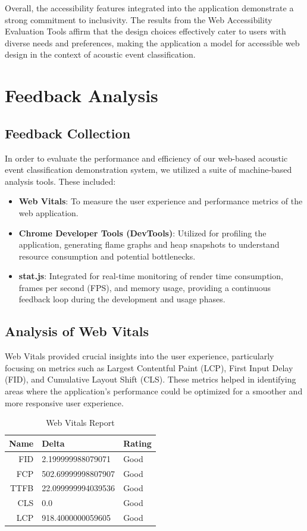 Overall, the accessibility features integrated into the application demonstrate a strong commitment to inclusivity. The results from the Web Accessibility Evaluation Tools affirm that the design choices effectively cater to users with diverse needs and preferences, making the application a model for accessible web design in the context of acoustic event classification.

\section{Feedback Analysis}
\subsection{Feedback Collection}
In order to evaluate the performance and efficiency of our web-based acoustic event classification demonstration system, we utilized a suite of machine-based analysis tools. These included:

\begin{itemize}
  \item \textbf{Web Vitals}: To measure the user experience and performance metrics of the web application.
  \item \textbf{Chrome Developer Tools (DevTools)}: Utilized for profiling the application, generating flame graphs and heap snapshots to understand resource consumption and potential bottlenecks.
  \item \textbf{stat.js}: Integrated for real-time monitoring of render time consumption, frames per second (FPS), and memory usage, providing a continuous feedback loop during the development and usage phases.
\end{itemize}

\subsection{Analysis of Web Vitals}
Web Vitals provided crucial insights into the user experience, particularly focusing on metrics such as Largest Contentful Paint (LCP), First Input Delay (FID), and Cumulative Layout Shift (CLS). These metrics helped in identifying areas where the application's performance could be optimized for a smoother and more responsive user experience.

\begin{table}[h!]
  \centering
  \begin{tabular}{|r|l|l|}
    \hline
    Name & Delta              & Rating \\ [0.5ex]
    \hline\hline
    FID  & 2.199999988079071  & Good   \\
    \hline
    FCP  & 502.69999998807907 & Good   \\
    \hline
    TTFB & 22.099999994039536 & Good   \\
    \hline
    CLS  & 0.0                & Good   \\
    \hline
    LCP  & 918.4000000059605  & Good   \\[1ex]
    \hline
  \end{tabular}
  \caption{\label{table:webvitals}Web Vitals Report}
\end{table}


